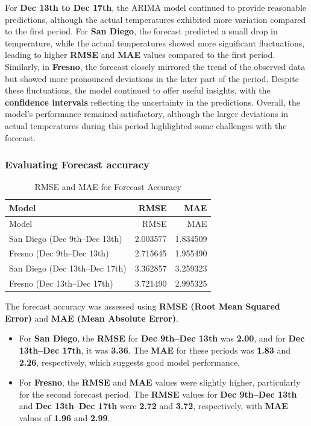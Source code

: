 \documentclass[
  11pt,
]{article}
\begin{document}
For \textbf{Dec 13th to Dec 17th}, the ARIMA model continued to provide
reasonable predictions, although the actual temperatures exhibited more
variation compared to the first period. For \textbf{San Diego}, the
forecast predicted a small drop in temperature, while the actual
temperatures showed more significant fluctuations, leading to higher
\textbf{RMSE} and \textbf{MAE} values compared to the first period.
Similarly, in \textbf{Fresno}, the forecast closely mirrored the trend
of the observed data but showed more pronounced deviations in the later
part of the period. Despite these fluctuations, the model continued to
offer useful insights, with the \textbf{confidence intervals} reflecting
the uncertainty in the predictions. Overall, the model's performance
remained satisfactory, although the larger deviations in actual
temperatures during this period highlighted some challenges with the
forecast.

\subsubsection{Evaluating Forecast
accuracy}\label{evaluating-forecast-accuracy}

\begin{longtable}[]{@{}lrr@{}}
\caption{RMSE and MAE for Forecast Accuracy}\tabularnewline
\toprule\noalign{}
Model & RMSE & MAE \\
\midrule\noalign{}
\endfirsthead
\toprule\noalign{}
Model & RMSE & MAE \\
\midrule\noalign{}
\endhead
\bottomrule\noalign{}
\endlastfoot
San Diego (Dec 9th--Dec 13th) & 2.003577 & 1.834509 \\
Fresno (Dec 9th--Dec 13th) & 2.715645 & 1.955490 \\
San Diego (Dec 13th--Dec 17th) & 3.362857 & 3.259323 \\
Fresno (Dec 13th--Dec 17th) & 3.721490 & 2.995325 \\
\end{longtable}

The forecast accuracy was assessed using \textbf{RMSE (Root Mean Squared
Error)} and \textbf{MAE (Mean Absolute Error)}.

\begin{itemize}
\item
  For \textbf{San Diego}, the \textbf{RMSE} for \textbf{Dec 9th--Dec
  13th} was \textbf{2.00}, and for \textbf{Dec 13th--Dec 17th}, it was
  \textbf{3.36}. The \textbf{MAE} for these periods was \textbf{1.83}
  and \textbf{2.26}, respectively, which suggests good model
  performance.
\item
  For \textbf{Fresno}, the \textbf{RMSE} and \textbf{MAE} values were
  slightly higher, particularly for the second forecast period. The
  \textbf{RMSE} values for \textbf{Dec 9th--Dec 13th} and \textbf{Dec
  13th--Dec 17th} were \textbf{2.72} and \textbf{3.72}, respectively,
  with \textbf{MAE} values of \textbf{1.96} and \textbf{2.99}.
\end{itemize}
\end{document}

